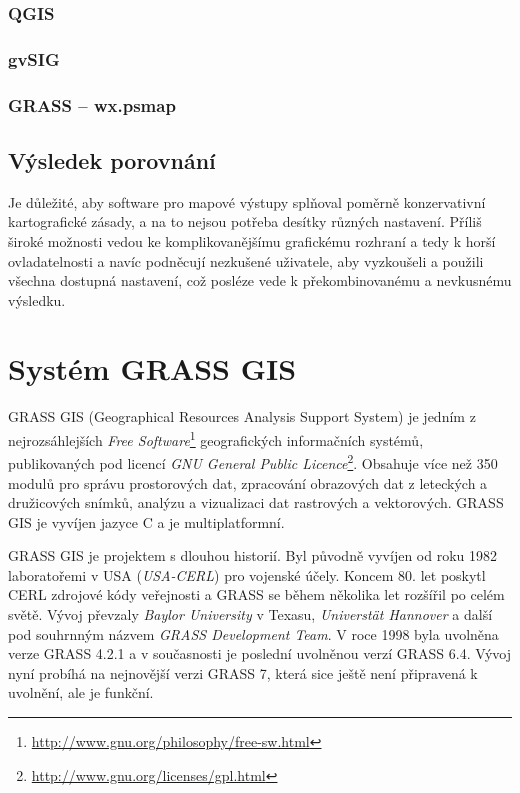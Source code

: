 \documentclass[a4paper,12pt,draft]{article}
\begin{document}
\subsubsection{QGIS}

\subsubsection{gvSIG}



\subsubsection{GRASS -- wx.psmap}

\subsection{Výsledek porovnání}
Je důležité, aby software pro mapové výstupy splňoval poměrně konzervativní kartografické zásady, a na to nejsou potřeba desítky různých nastavení. Příliš široké možnosti vedou ke komplikovanějšímu grafickému rozhraní a tedy k horší ovladatelnosti a navíc podněcují nezkušené uživatele, aby vyzkoušeli a použili všechna dostupná nastavení, což posléze vede k překombinovanému a nevkusnému výsledku.


\section{Systém GRASS GIS}
\label{sec:grass}
GRASS GIS (Geographical Resources Analysis Support System) je jedním z nejrozsáhlejších \emph{Free Software}\footnote{\url{http://www.gnu.org/philosophy/free-sw.html}} geografických informačních systémů, publikovaných pod licencí \emph{GNU General Public Licence}\footnote{\url{http://www.gnu.org/licenses/gpl.html}}. Obsahuje více než 350 modulů pro správu prostorových dat, zpracování obrazových dat z leteckých a družicových snímků, analýzu a vizualizaci dat rastrových a vektorových. GRASS GIS je vyvíjen jazyce C a je multiplatformní.

GRASS GIS je projektem s dlouhou historií. Byl původně vyvíjen od roku 1982 laboratořemi v USA (\emph{USA-CERL}) pro vojenské účely. Koncem 80. let poskytl CERL zdrojové kódy veřejnosti a GRASS se během několika let rozšířil po celém světě. Vývoj převzaly \emph{Baylor University} v Texasu, \emph{Universtät Hannover} a další pod souhrnným názvem \emph{GRASS Development Team}. V roce 1998 byla uvolněna verze GRASS 4.2.1 a v současnosti je poslední uvolněnou verzí GRASS 6.4. Vývoj nyní probíhá na nejnovější verzi GRASS 7, která sice ještě není připravená k uvolnění, ale je funkční. 
\end{document}
